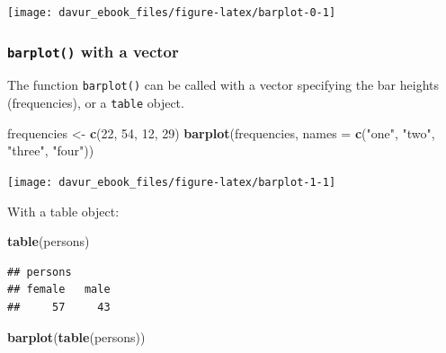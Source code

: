 \documentclass[]{book}
\newenvironment{Shaded}{\begin{snugshade}}{\end{snugshade}}
\newcommand{\DataTypeTok}[1]{\textcolor[rgb]{0.13,0.29,0.53}{#1}}
\newcommand{\DecValTok}[1]{\textcolor[rgb]{0.00,0.00,0.81}{#1}}
\newcommand{\KeywordTok}[1]{\textcolor[rgb]{0.13,0.29,0.53}{\textbf{#1}}}
\newcommand{\NormalTok}[1]{#1}
\newcommand{\StringTok}[1]{\textcolor[rgb]{0.31,0.60,0.02}{#1}}
\begin{document}
\begin{center}\texttt{[image: davur\_ebook\_files/figure-latex/barplot-0-1]} \end{center}

\hypertarget{barplot-with-a-vector}{%
\subsubsection*{\texorpdfstring{\texttt{barplot()} with a vector}{barplot() with a vector}}\label{barplot-with-a-vector}}

The function \texttt{barplot()} can be called with a vector specifying the bar heights (frequencies), or a \texttt{table} object.

\begin{Shaded}
\begin{Highlighting}[]
\NormalTok{frequencies <-}\StringTok{ }\KeywordTok{c}\NormalTok{(}\DecValTok{22}\NormalTok{, }\DecValTok{54}\NormalTok{, }\DecValTok{12}\NormalTok{, }\DecValTok{29}\NormalTok{)}
\KeywordTok{barplot}\NormalTok{(frequencies, }\DataTypeTok{names =} \KeywordTok{c}\NormalTok{(}\StringTok{"one"}\NormalTok{, }\StringTok{"two"}\NormalTok{, }\StringTok{"three"}\NormalTok{, }\StringTok{"four"}\NormalTok{))}
\end{Highlighting}
\end{Shaded}

\begin{center}\texttt{[image: davur\_ebook\_files/figure-latex/barplot-1-1]} \end{center}

With a table object:

\begin{Shaded}
\begin{Highlighting}[]
\KeywordTok{table}\NormalTok{(persons)}
\end{Highlighting}
\end{Shaded}

\begin{verbatim}
## persons
## female   male 
##     57     43
\end{verbatim}

\begin{Shaded}
\begin{Highlighting}[]
\KeywordTok{barplot}\NormalTok{(}\KeywordTok{table}\NormalTok{(persons))}
\end{Highlighting}
\end{Shaded}
\end{document}
